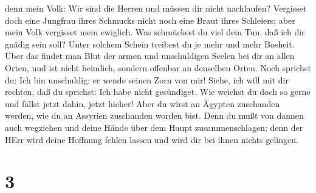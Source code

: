 denn mein Volk: Wir sind die Herren und müssen dir nicht nachlaufen?
 Vergisset doch eine Jungfrau ihres Schmucks nicht noch
eine Braut ihres Schleiers; aber mein Volk vergisset mein ewiglich.
 Was schmückest du viel dein Tun, daß ich dir gnädig sein
soll? Unter solchem Schein treibest du je mehr und mehr Bosheit.
 Über das findet man Blut der armen und unschuldigen Seelen
bei dir an allen Orten, und ist nicht heimlich, sondern offenbar an
denselben Orten.  Noch sprichst du: Ich bin unschuldig; er
wende seinen Zorn von mir! Siehe, ich will mit dir rechten, daß du
sprichst: Ich habe nicht gesündiget.  Wie weichst du doch
so gerne und fällst jetzt dahin, jetzt hieher! Aber du wirst an Ägypten
zuschanden werden, wie du an Assyrien zuschanden worden bist.
 Denn du mußt von dannen auch wegziehen und deine Hände
über dem Haupt zusammenschlagen; denn der HErr wird deine Hoffnung
fehlen lassen und wird dir bei ihnen nichts gelingen.

\hypertarget{section-2}{%
\section{3}\label{section-2}}

